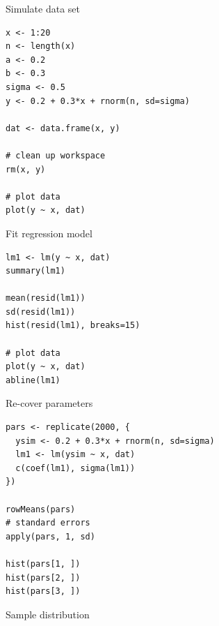 \documentclass[aspectratio=169]{beamer}
\begin{document}
{

\begin{frame}[fragile]{Simulate data set}
\begin{lstlisting}
x <- 1:20
n <- length(x)
a <- 0.2
b <- 0.3
sigma <- 0.5
y <- 0.2 + 0.3*x + rnorm(n, sd=sigma)

dat <- data.frame(x, y)

# clean up workspace
rm(x, y)

# plot data
plot(y ~ x, dat)
\end{lstlisting}
  \nocite{GelmanHill2020}
\end{frame}

\begin{frame}[fragile]{Fit regression model}
\begin{lstlisting}
lm1 <- lm(y ~ x, dat)
summary(lm1)

mean(resid(lm1))
sd(resid(lm1))
hist(resid(lm1), breaks=15)

# plot data
plot(y ~ x, dat)
abline(lm1)
\end{lstlisting}
\end{frame}

\begin{frame}[fragile]{Re-cover parameters}
\begin{lstlisting}
pars <- replicate(2000, {
  ysim <- 0.2 + 0.3*x + rnorm(n, sd=sigma)
  lm1 <- lm(ysim ~ x, dat)
  c(coef(lm1), sigma(lm1))
})

rowMeans(pars)
# standard errors
apply(pars, 1, sd)

hist(pars[1, ])
hist(pars[2, ])
hist(pars[3, ])
\end{lstlisting}
\end{frame}

}

\begin{frame}{Sample distribution}
  \begin{center}
  \end{center}
\end{frame}
\end{document}
